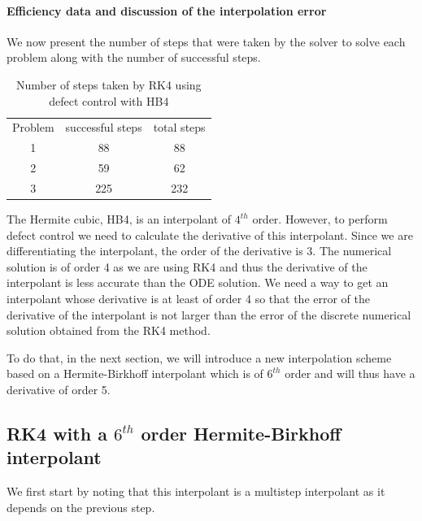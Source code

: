 \paragraph{Efficiency data and discussion of the interpolation error}
We now present the number of steps that were taken by the solver to solve each problem along with the number of successful steps.

\begin{table}[h]
\caption {Number of steps taken by RK4 using defect control with HB4} \label{tab:rk4_with_hb4_nsteps}
\begin{center}
\begin{tabular}{ c c c } 
Problem & successful steps & total steps \\ 
1       & 88                         & 88 \\ 
2       & 59                         & 62 \\
3       & 225                        & 232 \\
\end{tabular}
\end{center}
\end{table}

The Hermite cubic, HB4, is an interpolant of $4^{th}$ order. However, to perform defect control we need to calculate the derivative of this interpolant. Since we are differentiating the interpolant, the order of the derivative is 3. The numerical solution is of order 4 as we are using RK4 and thus the derivative of the interpolant is less accurate than the ODE solution. We need a way to get an interpolant whose derivative is at least of order 4 so that the error of the derivative of the interpolant is not larger than the error of the discrete numerical solution obtained from the RK4 method.

To do that, in the next section, we will introduce a new interpolation scheme based on a Hermite-Birkhoff interpolant which is of $6^{th}$ order and will thus have a derivative of order 5.

\subsection{RK4 with a $6^{th}$ order Hermite-Birkhoff interpolant}
We first start by noting that this interpolant is a multistep interpolant as it depends on the previous step.

